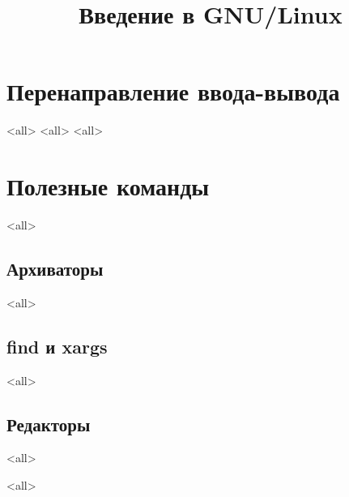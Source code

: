 

\title{Введение в GNU/Linux}








\begin{frame}
	\frametitle{}
	\titlepage
	\vspace{-0.5cm}
	\begin{center}
	\end{center}
\end{frame}



\section{Перенаправление ввода-вывода}
\mode<all>{}
\mode<all>{}
\mode<all>{}

\section{Полезные команды}

\mode<all>{}

\subsection{Архиваторы}
\mode<all>{}

\subsection{find и xargs}
\mode<all>{}

\subsection{Редакторы}
\mode<all>{}

\mode<all>

